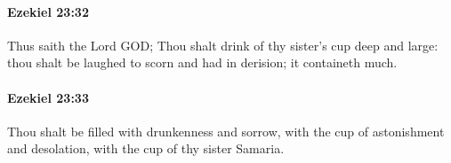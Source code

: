 		\paragraph{Ezekiel 23:32} %
			\label{EZEKIEL-23-32}

			Thus saith the Lord GOD; Thou shalt drink of thy sister’s cup deep and large: thou shalt be laughed to scorn and had in derision; it containeth much.


		\paragraph{Ezekiel 23:33} %
			\label{EZEKIEL-23-33}

			Thou shalt be filled with drunkenness and sorrow, with the cup of astonishment and desolation, with the cup of thy sister Samaria.


